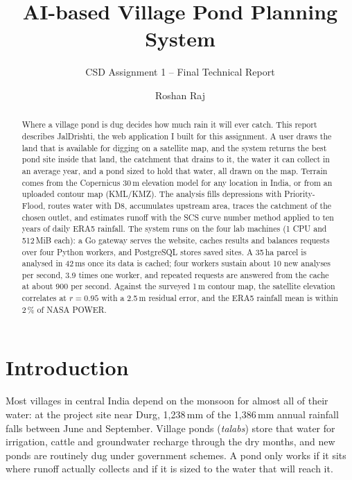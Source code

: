 \documentclass[manuscript,screen,review]{acmart}
\begin{document}
\title{AI-based Village Pond Planning System}
\subtitle{CSD Assignment 1 -- Final Technical Report}

\author{Roshan Raj}

\renewcommand{\shortauthors}{Raj}

\begin{abstract}
Where a village pond is dug decides how much rain it will ever catch. This report describes
JalDrishti, the web application I built for this assignment. A user draws the land that is
available for digging on a satellite map, and the system returns the best pond site inside that
land, the catchment that drains to it, the water it can collect in an average year, and a pond
sized to hold that water, all drawn on the map. Terrain comes from the Copernicus 30\,m elevation
model for any location in India, or from an uploaded contour map (KML/KMZ). The analysis fills
depressions with Priority-Flood, routes water with D8, accumulates upstream area, traces the
catchment of the chosen outlet, and estimates runoff with the SCS curve number method applied to
ten years of daily ERA5 rainfall. The system runs on the four lab machines (1 CPU and 512\,MiB
each): a Go gateway serves the website, caches results and balances requests over four Python
workers, and PostgreSQL stores saved sites. A 35\,ha parcel is analysed in 42\,ms once its data
is cached; four workers sustain about 10 new analyses per second, 3.9 times one worker, and
repeated requests are answered from the cache at about 900 per second. Against the surveyed
1\,m contour map, the satellite elevation correlates at $r=0.95$ with a 2.5\,m residual error,
and the ERA5 rainfall mean is within 2\,\% of NASA POWER.
\end{abstract}


\maketitle

\section{Introduction}
\label{sec:intro}
Most villages in central India depend on the monsoon for almost all of their water: at the
project site near Durg, 1{,}238\,mm of the 1{,}386\,mm annual rainfall falls between June and
September. Village ponds (\emph{talabs}) store that water for irrigation, cattle and groundwater
recharge through the dry months, and new ponds are routinely dug under government schemes. A pond
only works if it sits where runoff actually collects and if it is sized to the water that will
reach it.
\end{document}
